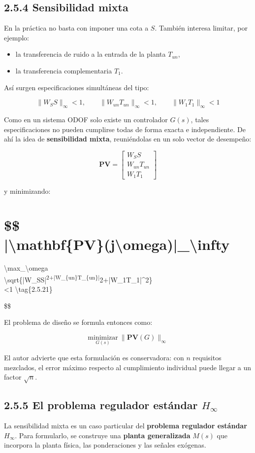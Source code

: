 \subsection{2.5.4 Sensibilidad mixta}
En la práctica no basta con imponer una cota a \(S\). También interesa limitar, por ejemplo:

\begin{itemize}
  \item la transferencia de ruido a la entrada de la planta \(T_{un}\),
  \item la transferencia complementaria \(T_1\).
\end{itemize}

Así surgen especificaciones simultáneas del tipo:

\[
\|W_S S\|_\infty<1,\qquad
\|W_{un}T_{un}\|_\infty<1,\qquad
\|W_1T_1\|_\infty<1 \tag{2.5.19}
\]

Como en un sistema ODOF solo existe un controlador \(G(s)\), tales especificaciones no pueden cumplirse todas de forma exacta e independiente. De ahí la idea de \textbf{sensibilidad mixta}, reuniéndolas en un solo vector de desempeño:

\[
\mathbf{PV}=
\begin{bmatrix}
W_S S\\
W_{un}T_{un}\\
W_1T_1
\end{bmatrix}
\tag{2.5.20}
\]

y minimizando:

\section{\$\$\\
|\textbackslash mathbf\{PV\}(j\textbackslash omega)|\_\textbackslash infty}
\textbackslash max\_\textbackslash omega\\
\textbackslash sqrt\{|W\_SS|\textsuperscript{2+|W\_\{un\}T\_\{un\}|}2+|W\_1T\_1|\^{}2\}\\
<1 \textbackslash tag\{2.5.21\}

\$\$

El problema de diseño se formula entonces como:

\[
\underset{G(s)}{\text{minimizar}}\ \|\mathbf{PV}(G)\|_\infty \tag{2.5.22}
\]

El autor advierte que esta formulación es conservadora: con \(n\) requisitos mezclados, el error máximo respecto al cumplimiento individual puede llegar a un factor \(\sqrt{n}\).

\subsection{2.5.5 El problema regulador estándar \(H_\infty\)}
La sensibilidad mixta es un caso particular del \textbf{problema regulador estándar \(H_\infty\)}. Para formularlo, se construye una \textbf{planta generalizada} \(M(s)\) que incorpora la planta física, las ponderaciones y las señales exógenas.

